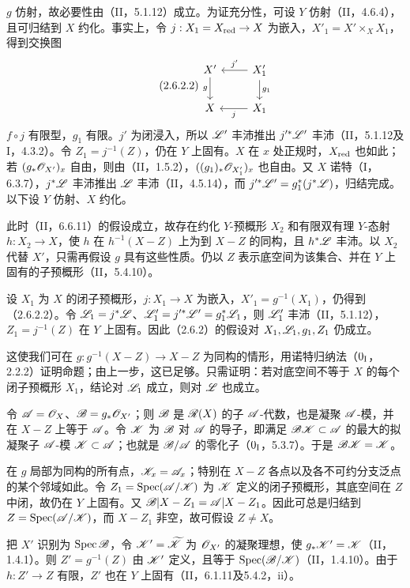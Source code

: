 $g$ 仿射，故必要性由（II，5.1.12）成立。为证充分性，可设 $Y$ 仿射（II，4.6.4），且可归结到 $X$ 约化。事实上，令 $j:X_1=X_{\mathrm{red}}\to X$ 为嵌入，$X'_1=X'\times_XX_1$，得到交换图
\begin{equation}\tag{2.6.2.2}
\begin{tikzcd}
X'\arrow[d,"g"']&X'_1\arrow[l,"j'"']\arrow[d,"g_1"]\\
X&X_1\arrow[l,"j"]
\end{tikzcd}
\end{equation}
$f\circ j$ 有限型，$g_1$ 有限。$j'$ 为闭浸入，所以 $\mathscr L'$ 丰沛推出 $j'^*\mathscr L'$ 丰沛（II，5.1.12及I，4.3.2）。令 $Z_1=j^{-1}(Z)$，仍在 $Y$ 上固有。$X$ 在 $x$ 处正规时，$X_{\mathrm{red}}$ 也如此；若 $(g_*\mathscr O_{X'})_x$ 自由，则由（II，1.5.2），$((g_1)_*\mathscr O_{X'_1})_x$ 也自由。又 $X$ 诺特（I，6.3.7），$j^*\mathscr L$ 丰沛推出 $\mathscr L$ 丰沛（II，4.5.14），而 $j'^*\mathscr L'=g_1^*(j^*\mathscr L)$，归结完成。以下设 $Y$ 仿射、$X$ 约化。

此时（II，6.6.11）的假设成立，故存在约化 $Y$-预概形 $X_2$ 和有限双有理 $Y$-态射 $h:X_2\to X$，使 $h$ 在 $h^{-1}(X-Z)$ 上为到 $X-Z$ 的同构，且 $h^*\mathscr L$ 丰沛。以 $X_2$ 代替 $X'$，只需再假设 $g$ 具有这些性质。仍以 $Z$ 表示底空间为该集合、并在 $Y$ 上固有的子预概形（II，5.4.10）。

设 $X_1$ 为 $X$ 的闭子预概形，$j:X_1\to X$ 为嵌入，$X'_1=g^{-1}(X_1)$，仍得到（2.6.2.2）。令 $\mathscr L_1=j^*\mathscr L$、$\mathscr L'_1=j'^*\mathscr L'=g_1^*\mathscr L_1$，则 $\mathscr L'_1$ 丰沛（II，5.1.12），$Z_1=j^{-1}(Z)$ 在 $Y$ 上固有。因此（2.6.2）的假设对 $X_1,\mathscr L_1,g_1,Z_1$ 仍成立。

这使我们可在 $g:g^{-1}(X-Z)\to X-Z$ 为同构的情形，用诺特归纳法（$0_{\mathrm I}$，2.2.2）证明命题；由上一步，这已足够。只需证明：若对底空间不等于 $X$ 的每个闭子预概形 $X_1$，结论对 $\mathscr L_1$ 成立，则对 $\mathscr L$ 也成立。

令 $\mathscr A=\mathscr O_X$、$\mathscr B=g_*\mathscr O_{X'}$；则 $\mathscr B$ 是 $\mathscr R(X)$ 的子 $\mathscr A$-代数，也是凝聚 $\mathscr A$-模，并在 $X-Z$ 上等于 $\mathscr A$。令 $\mathscr K$ 为 $\mathscr B$ 对 $\mathscr A$ 的导子，即满足 $\mathscr B\mathscr K\subset\mathscr A$ 的最大的拟凝聚子 $\mathscr A$-模 $\mathscr K\subset\mathscr A$；也就是 $\mathscr B/\mathscr A$ 的零化子（$0_{\mathrm I}$，5.3.7）。于是 $\mathscr B\mathscr K=\mathscr K$。

在 $g$ 局部为同构的所有点，$\mathscr K_x=\mathscr A_x$；特别在 $X-Z$ 各点以及各不可约分支泛点的某个邻域如此。令 $Z_1=\operatorname{Spec}(\mathscr A/\mathscr K)$ 为 $\mathscr K$ 定义的闭子预概形，其底空间在 $Z$ 中闭，故仍在 $Y$ 上固有。又 $\mathscr B|X-Z_1=\mathscr A|X-Z_1$。因此可总是归结到 $Z=\operatorname{Spec}(\mathscr A/\mathscr K)$，而 $X-Z_1$ 非空，故可假设 $Z\ne X$。

把 $X'$ 识别为 $\operatorname{Spec}\mathscr B$，令 $\mathscr K'=\widetilde{\mathscr K}$ 为 $\mathscr O_{X'}$ 的凝聚理想，使 $g_*\mathscr K'=\mathscr K$（II，1.4.1）。则 $Z'=g^{-1}(Z)$ 由 $\mathscr K'$ 定义，且等于 $\operatorname{Spec}(\mathscr B/\mathscr K)$（II，1.4.10）。由于 $h:Z'\to Z$ 有限，$Z'$ 也在 $Y$ 上固有（II，6.1.11及5.4.2，ii）。

